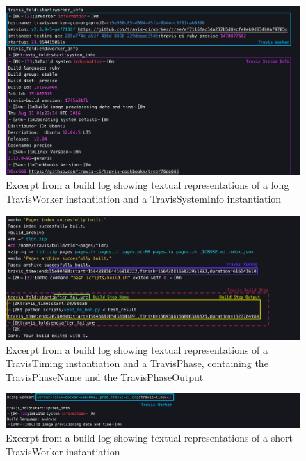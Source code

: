 \documentclass[\myrootdir/main.tex]{subfiles}
\begin{document}
\begin{figure}[htbp]
	\centering
	\includegraphics[width=\textwidth, clip]{img/log0.png}
	\caption{Excerpt from a build log showing textual representations of a long TravisWorker instantiation and a TravisSystemInfo instantiation}
	\label{fig:log-0}
\end{figure}
\begin{figure}[htbp]
	\centering
	\includegraphics[width=\textwidth, clip]{img/log1.png}
	\caption{Excerpt from a build log showing textual representations of a TravisTiming instantiation and a TravisPhase, containing the TravisPhaseName and the TravisPhaseOutput}
	\label{fig:log-1}
\end{figure}
\begin{figure}[htbp]
	\centering
	\includegraphics[width=\textwidth, clip]{img/log2.png}
	\caption{Excerpt from a build log showing textual representations of a short TravisWorker instantiation}
	\label{fig:log-2}
\end{figure}
\end{document}
